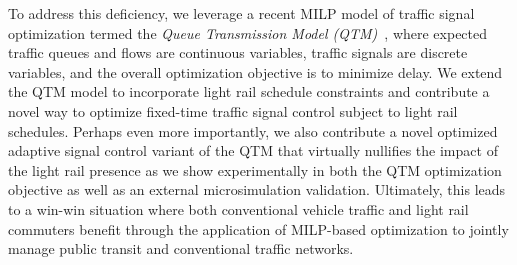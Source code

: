 To address this deficiency, we leverage a recent MILP model of traffic
signal optimization termed the {\it Queue Transmission Model
  (QTM)}~\cite{trbPaperToAppear}, where expected traffic queues and
flows are continuous variables, traffic signals are discrete
variables, and the overall optimization objective is to minimize
delay.
We extend the QTM model to incorporate light
rail schedule constraints and contribute a novel way to optimize
fixed-time traffic signal control subject to light rail schedules.  
Perhaps even more importantly, we also contribute a novel optimized
adaptive signal control variant of the QTM that virtually nullifies
the impact of the light rail presence as we show experimentally in
both the QTM optimization objective as well as an external
microsimulation validation.  
Ultimately, this leads to a
win-win situation where both conventional vehicle traffic and light
rail commuters benefit through the application of MILP-based
optimization to jointly manage public transit and conventional traffic
networks.




